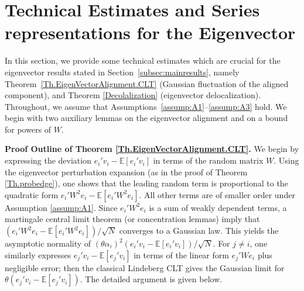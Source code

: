 \documentclass[11pt, reqno]{amsart}
\numberwithin{equation}{section}
\newcommand{\E}{\mbox{${\mathbb E}$}}
\begin{document}
% 
\section{Technical Estimates and Series representations for the Eigenvector}\label{section:evseries}

In this section, we provide some technical estimates which are crucial for the eigenvector results stated in Section~\ref{subsec:mainresults}, namely
Theorem~\ref{Th.EigenVectorAlignment.CLT} (Gaussian fluctuation of the aligned component),
and Theorem \ref{Decolalization} (eigenvector
delocalization). Throughout, we assume that Assumptions~\ref{assump:A1}--\ref{assump:A3} hold. We
begin with two auxiliary lemmas on the eigenvector alignment and on a bound for powers of $W$.

\noindent\textbf{Proof Outline of Theorem \ref{Th.EigenVectorAlignment.CLT}.} We begin by expressing the deviation $e_i'v_i - \E[e_i'v_i]$ in terms of the random matrix $W$.  Using the eigenvector perturbation expansion (as in the proof of Theorem \ref{Th.probedge}), one shows that the leading random term is proportional to the quadratic form $e_i'W^2e_i - \E[e_i'W^2e_i]$.  All other terms are of smaller order under Assumption \eqref{assump:A1}.  Since $e_i'W^2e_i$ is a sum of weakly dependent terms, a martingale central limit theorem (or concentration lemmas) imply that $(e_i'W^2e_i - \E[e_i'W^2e_i])/\sqrt{N}$ converges to a Gaussian law.  This yields the asymptotic normality of $(\theta\alpha_i)^2(e_i'v_i - \E[e_i'v_i])/\sqrt{N}$.  For $j\neq i$, one similarly expresses $e_j'v_i - \E[e_j'v_i]$ in terms of the linear form $e_j'We_i$ plus negligible error; then the classical Lindeberg CLT gives the Gaussian limit for $\theta(e_j'v_i-\E[e_j'v_i])$.  The detailed argument is given below. 
\end{document}

